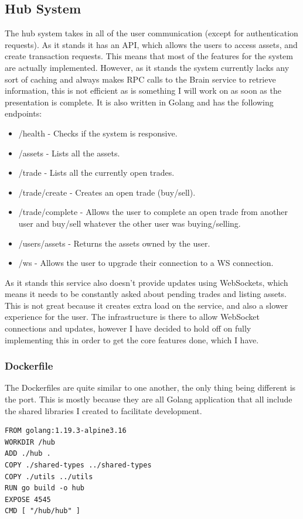 \documentclass[titlepage]{article}
\begin{document}
\subsection{Hub System}
The hub system takes in all of the user communication (except for authentication requests). As it stands it has an API, which allows the users to access assets, and create transaction requests. This means that most of the features for the system are actually implemented. However, as it stands the system currently lacks any sort of caching and always makes RPC calls to the Brain service to retrieve information, this is not efficient as is something I will work on as soon as the presentation is complete. It is also written in Golang and has the following endpoints:

\begin{itemize}
  \item /health - Checks if the system is responsive.
  \item /assets - Lists all the assets.
  \item /trade - Lists all the currently open trades.
  \item /trade/create - Creates an open trade (buy/sell).
  \item /trade/complete - Allows the user to complete an open trade from another user and buy/sell whatever the other user was buying/selling.
  \item /users/assets - Returns the assets owned by the user.
  \item /ws - Allows the user to upgrade their connection to a WS connection.
\end{itemize}

As it stands this service also doesn't provide updates using WebSockets, which means it needs to be constantly asked about pending trades and listing assets. This is not great because it creates extra load on the service, and also a slower experience for the user. The infrastructure is there to allow WebSocket connections and updates, however I have decided to hold off on fully implementing this in order to get the core features done, which I have.

\subsubsection{Dockerfile}
The Dockerfiles are quite similar to one another, the only thing being different is the port. This is mostly because they are all Golang application that all include the shared libraries I created to facilitate development.
\begin{verbatim}
FROM golang:1.19.3-alpine3.16
WORKDIR /hub
ADD ./hub .
COPY ./shared-types ../shared-types
COPY ./utils ../utils
RUN go build -o hub
EXPOSE 4545
CMD [ "/hub/hub" ]
\end{verbatim}
\end{document}
